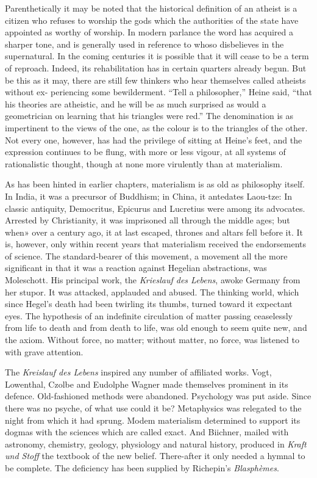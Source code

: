 \documentclass[]{book}
\begin{document}
Parenthetically it may be noted that the historical definition of an
atheist is a citizen who refuses to worship the gods which the
authorities of the state have appointed as worthy of worship. In modern
parlance the word has acquired a sharper tone, and is generally used in
reference to whoso disbelieves in the supernatural. In the coming
centuries it is possible that it will cease to be a term of reproach.
Indeed, its rehabilitation has in certain quarters already begun. But be
this as it may, there are still few thinkers who hear themselves called
atheists without ex- periencing some bewilderment. ``Tell a
philosopher,'' Heine said, ``that his theories are atheistic, and he
will be as much surprised as would a geometrician on learning that his
triangles were red.'' The denomination is as impertinent to the views of
the one, as the colour is to the triangles of the other. Not every one,
however, has had the privilege of sitting at Heine's feet, and the
expression continues to be flung, with more or less vigour, at all
systems of rationalistic thought, though at none more virulently than at
materialism.

As has been hinted in earlier chapters, materialism is as old as
philosophy itself. In India, it was a precursor of Buddhism; in China,
it antedates Laou-tze: In classic antiquity, Democritus, Epicurus and
Lucretius were among its advocates. Arrested by Christianity, it was
imprisoned all through the middle ages; but when» over a century ago, it
at last escaped, thrones and altars fell before it. It is, however, only
within recent years that materialism received the endorsements of
science. The standard-bearer of this movement, a movement all the more
significant in that it was a reaction against Hegelian abstractions, was
Moleschott. His principal work, the \emph{Krieslauf des Lebens}, awoke
Germany from her stupor. It was attacked, applauded and abused. The
thinking world, which since Hegel's death had been twirling its thumbs,
turned toward it expectant eyes. The hypothesis of an indefinite
circulation of matter passing ceaselessly from life to death and from
death to life, was old enough to seem quite new, and the axiom. Without
force, no matter; without matter, no force, was listened to with grave
attention.

The \emph{Kreislauf des Lebens} inspired any number of affiliated works.
Vogt, Lowenthal, Czolbe and Eudolphe Wagner made themselves prominent in
its defence. Old-fashioned methods were abandoned. Psychology was put
aside. Since there was no psyche, of what use could it be? Metaphysics
was relegated to the night from which it had sprung. Modem materialism
determined to support its dogmas with the sciences which are called
exact. And Biichner, mailed with astronomy, chemistry, geology,
physiology and natural history, produced in \emph{Kraft und Stoff} the
textbook of the new belief. There-after it only needed a hymnal to be
complete. The deficiency has been supplied by Richepin's
\emph{Blasphèmes}.
\end{document}
